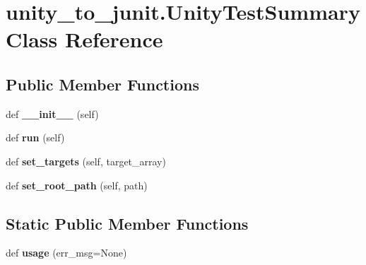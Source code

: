 \hypertarget{classunity__to__junit_1_1UnityTestSummary}{}\section{unity\+\_\+to\+\_\+junit.\+Unity\+Test\+Summary Class Reference}
\label{classunity__to__junit_1_1UnityTestSummary}
\subsection*{Public Member Functions}
\begin{DoxyCompactItemize}
\item 
\mbox{\label{classunity__to__junit_1_1UnityTestSummary_a9c7216043b32f182c07f48bd0e43b888}} 
def {\bfseries \+\_\+\+\_\+init\+\_\+\+\_\+} (self)
\item 
\mbox{\label{classunity__to__junit_1_1UnityTestSummary_afdd46a63352b8ab9acaa8f64ec6c3797}} 
def {\bfseries run} (self)
\item 
\mbox{\label{classunity__to__junit_1_1UnityTestSummary_aa7070ab538f01899a2188a62bdca09ee}} 
def {\bfseries set\+\_\+targets} (self, target\+\_\+array)
\item 
\mbox{\label{classunity__to__junit_1_1UnityTestSummary_a1d9761b8e561dc10ce2997b30a497f68}} 
def {\bfseries set\+\_\+root\+\_\+path} (self, path)
\end{DoxyCompactItemize}
\subsection*{Static Public Member Functions}
\begin{DoxyCompactItemize}
\item 
\mbox{\label{classunity__to__junit_1_1UnityTestSummary_a8af06f2da95b1ebb819e3c83e37f0700}} 
def {\bfseries usage} (err\+\_\+msg=None)
\end{DoxyCompactItemize}
